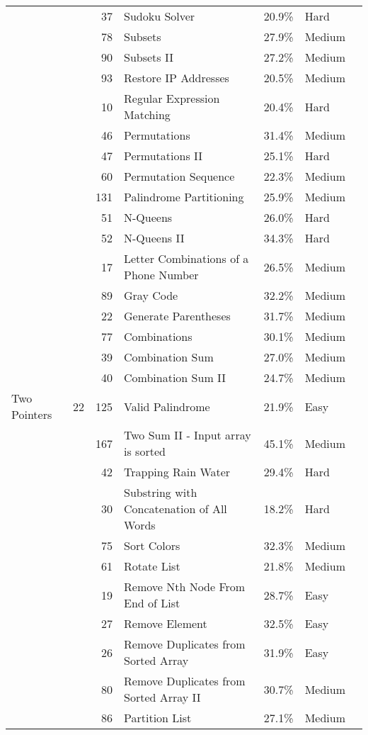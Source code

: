 \documentclass[9pt,b5paper]{article}
\begin{document}
\begin{center}
\begin{tabular}{lrrllll}
 &  & 37 & Sudoku Solver & 20.9\% & Hard & \\
 &  & 78 & Subsets & 27.9\% & Medium & \\
 &  & 90 & Subsets II & 27.2\% & Medium & \\
 &  & 93 & Restore IP Addresses & 20.5\% & Medium & \\
 &  & 10 & Regular Expression Matching & 20.4\% & Hard & \\
 &  & 46 & Permutations & 31.4\% & Medium & \\
 &  & 47 & Permutations II & 25.1\% & Hard & \\
 &  & 60 & Permutation Sequence & 22.3\% & Medium & \\
 &  & 131 & Palindrome Partitioning & 25.9\% & Medium & \\
 &  & 51 & N-Queens & 26.0\% & Hard & \\
 &  & 52 & N-Queens II & 34.3\% & Hard & \\
 &  & 17 & Letter Combinations of a Phone Number & 26.5\% & Medium & \\
 &  & 89 & Gray Code & 32.2\% & Medium & \\
 &  & 22 & Generate Parentheses & 31.7\% & Medium & \\
 &  & 77 & Combinations & 30.1\% & Medium & \\
 &  & 39 & Combination Sum & 27.0\% & Medium & \\
 &  & 40 & Combination Sum II & 24.7\% & Medium & \\
\hline
Two Pointers & 22 & 125 & Valid Palindrome & 21.9\% & Easy & \\
 &  & 167 & Two Sum II - Input array is sorted & 45.1\% & Medium & \\
 &  & 42 & Trapping Rain Water & 29.4\% & Hard & \\
 &  & 30 & Substring with Concatenation of All Words & 18.2\% & Hard & \\
 &  & 75 & Sort Colors & 32.3\% & Medium & \\
 &  & 61 & Rotate List & 21.8\% & Medium & \\
 &  & 19 & Remove Nth Node From End of List & 28.7\% & Easy & \\
 &  & 27 & Remove Element & 32.5\% & Easy & \\
 &  & 26 & Remove Duplicates from Sorted Array & 31.9\% & Easy & \\
 &  & 80 & Remove Duplicates from Sorted Array II & 30.7\% & Medium & \\
 &  & 86 & Partition List & 27.1\% & Medium & \\

\end{tabular}
\end{center}
\end{document}
